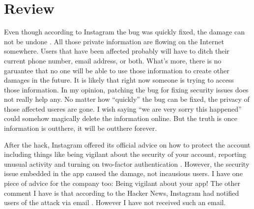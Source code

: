 \documentclass[12pt]{article}
\begin{document}
\section{Review}
Even though according to Instagram the bug was quickly fixed, the damage can not be undone \cite{INS}. All those private information are flowing on the Internet somewhere. Users that have been affected probably will have to ditch their current phone number, email address, or both. What's more, there is no garuantee that no one will be able to use those information to create other damages in the future. It is likely that right now someone is trying to access those information. In my opinion, patching the bug for fixing security issues does not really help any. No matter how ``quickly'' the bug can be fixed, the privacy of those affected useres are gone. I wish saying ``we are very sorry this happened'' could somehow magically delete the information online. But the truth is once information is outthere, it will be outthere forever.

After the hack, Instagram offered its official advice on how to protect the account including things like being vigilant about the security of your account, reporting unusual activity and turning on two-factor authentication \cite{INS}\cite{THN}. However, the security issue embedded in the app caused the damage, not incausious users. I have one piece of advice for the company too: Being vigilant about your app! The other comment I have is that according to the Hacker News, Instagram had notified users of the attack via email \cite{THN}. However I have not received such an email.

\newpage


\end{document}
